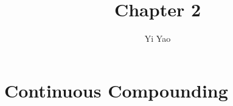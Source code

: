 \documentclass{article}
\title{Chapter 2}
\author{Yi Yao}
\begin{document}
    \maketitle
    \section{Continuous Compounding}
    
\end{document}
